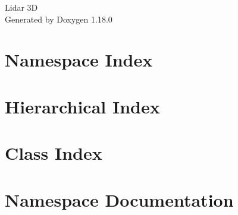 \documentclass[twoside]{book}
\newcommand{\+}{\discretionary{\mbox{\scriptsize$\hookleftarrow$}}{}{}}
\newcommand{\clearemptydoublepage}{%
    \newpage{\pagestyle{empty}\cleardoublepage}%
  }
\begin{document}
  \raggedbottom
    \hypersetup{pageanchor=false,
                bookmarksnumbered=true,
                pdfencoding=unicode
               }
  \begin{titlepage}
  \vspace*{7cm}
  \begin{center}%
  {\Large Lidar 3D}\\
  \vspace*{1cm}
  {\large Generated by Doxygen 1.18.0}\\
  \end{center}
  \end{titlepage}
  \clearemptydoublepage
  \tableofcontents
  \clearemptydoublepage
  \hypersetup{pageanchor=true}
\chapter{Namespace Index}

\chapter{Hierarchical Index}

\chapter{Class Index}

\chapter{Namespace Documentation}










\end{document}
